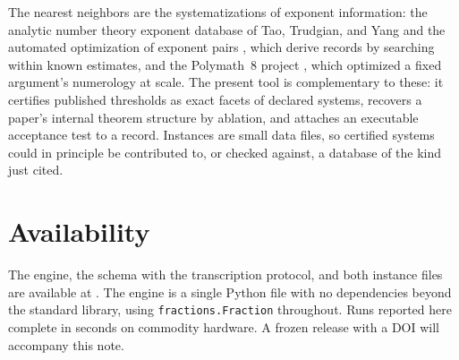 \documentclass[11pt]{article}
\begin{document}
The nearest neighbors are the systematizations of exponent
information: the analytic number theory exponent database of Tao,
Trudgian, and Yang \cite{antedb} and the automated optimization of
exponent pairs \cite{trudgian-yang}, which derive records by searching
within known estimates, and the Polymath~8 project \cite{polymath8},
which optimized a fixed argument's numerology at scale. The present
tool is complementary to these: it certifies published thresholds as
exact facets of declared systems, recovers a paper's internal theorem
structure by ablation, and attaches an executable acceptance test to a
record. Instances are small data files, so certified systems could in
principle be contributed to, or checked against, a database of the
kind just cited.

\section{Availability}\label{sec:avail}

The engine, the schema with the transcription protocol, and both
instance files are available at \cite{repo}. The engine is a single
Python file with no dependencies beyond the standard library, using
\texttt{fractions.Fraction} throughout. Runs reported here complete in
seconds on commodity hardware. A frozen release with a DOI will
accompany this note.

\end{document}

